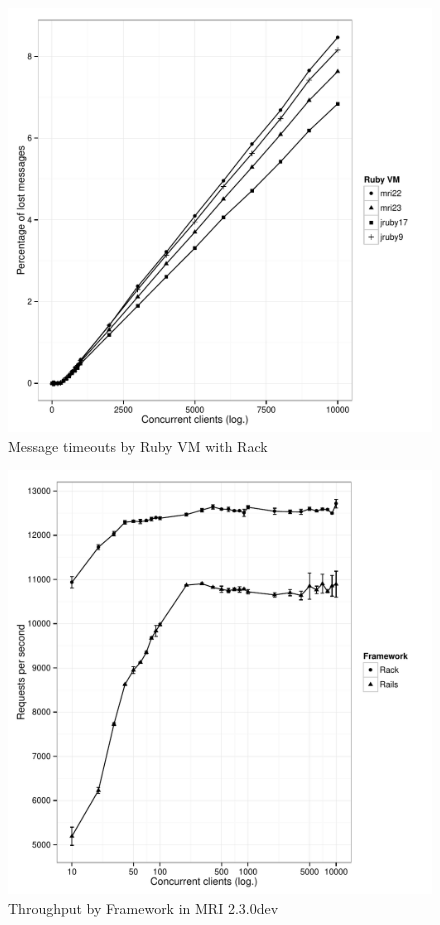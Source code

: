 		\begin{figure}
			\begin{center}
				\includegraphics[width=\textwidth]{images/loss-vms-rack.pdf}
			\end{center}
			\caption{Message timeouts by Ruby \ac{VM} with Rack}
			\label{img:evaluation:loss-vms-rack}
		\end{figure}

		\begin{figure}
			\begin{center}
				\includegraphics[width=\textwidth]{images/throughput-frameworks-mri23.pdf}
			\end{center}
			\caption{Throughput by Framework in \ac{MRI} 2.3.0dev}
			\label{img:evaluation:throughput-frameworks-mri23}
		\end{figure}

